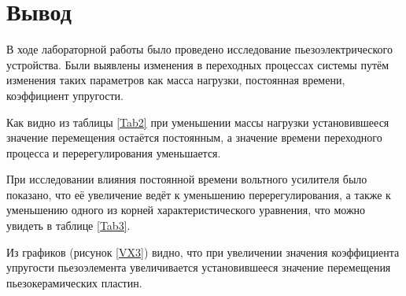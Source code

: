 \documentclass[12pt,a4paper]{article}
\begin{document}
\section*{Вывод}
В ходе лабораторной работы было проведено исследование пьезоэлектрического устройства. 
Были выявлены изменения в переходных процессах системы путём изменения таких параметров как масса нагрузки, постоянная времени, коэффициент упругости.\par
Как видно из таблицы \ref{Tab2} при уменьшении массы нагрузки установившееся значение перемещения остаётся постоянным, а значение времени переходного процесса и перерегулирования уменьшается. \par
При исследовании влияния постоянной времени вольтного усилителя было показано, что её увеличение ведёт к уменьшению перерегулирования, а также к уменьшению одного из корней характеристического уравнения, что можно увидеть в таблице \ref{Tab3}.\par
Из графиков (рисунок \ref{VX3}) видно, что при увеличении значения коэффициента упругости пьезоэлемента увеличивается установившееся значение перемещения пьезокерамических пластин.
\end{document}
